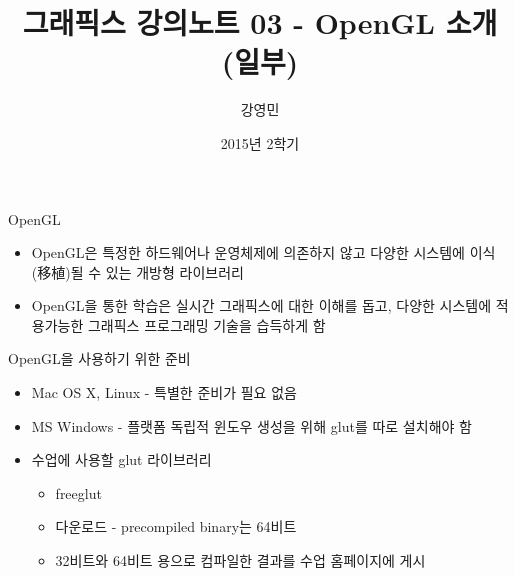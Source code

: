 \documentclass{beamer}
\title[3D 그래픽스 프로그래밍]{그래픽스 강의노트 03 - OpenGL 소개 (일부)}
\author{강영민}
\institute{동명대학교}
\date{2015년 2학기}
\begin{document}
\begin{frame}
  \titlepage
\end{frame}



\begin{frame}{OpenGL}

\begin{itemize}
\item OpenGL은 특정한 하드웨어나 운영체제에 의존하지 않고 다양한 시스템에 이식(移植)될 수 있는 개방형 라이브러리
\item OpenGL을 통한 학습은 실시간 그래픽스에 대한 이해를 돕고, 다양한 시스템에 적용가능한 그래픽스 프로그래밍 기술을 습득하게 함
\end{itemize}
\end{frame}

\begin{frame}{OpenGL을 사용하기 위한 준비}

\begin{itemize}
\item Mac OS X, Linux - 특별한 준비가 필요 없음
\item MS Windows - 플랫폼 독립적 윈도우 생성을 위해 glut를 따로 설치해야 함
\end{itemize}

\begin{itemize}
\item 수업에 사용할 glut 라이브러리
	\begin{itemize}
	\item freeglut
	\item 다운로드 - precompiled binary는 64비트 
	\item 32비트와 64비트 용으로 컴파일한 결과를 수업 홈페이지에 게시
	\end{itemize}
\end{itemize}

\end{frame}
\end{document}
